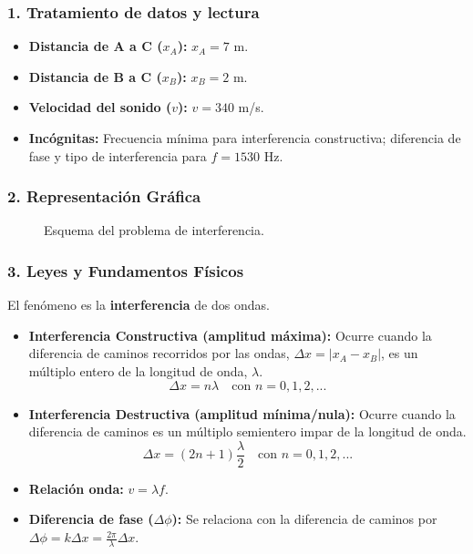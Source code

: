 \subsubsection*{1. Tratamiento de datos y lectura}
\begin{itemize}
    \item \textbf{Distancia de A a C ($x_A$):} $x_A = 7$ m.
    \item \textbf{Distancia de B a C ($x_B$):} $x_B = 2$ m.
    \item \textbf{Velocidad del sonido ($v$):} $v = 340$ m/s.
    \item \textbf{Incógnitas:} Frecuencia mínima para interferencia constructiva; diferencia de fase y tipo de interferencia para $f=1530$ Hz.
\end{itemize}

\subsubsection*{2. Representación Gráfica}
\begin{figure}[H]
    \centering
    \caption{Esquema del problema de interferencia.}
\end{figure}

\subsubsection*{3. Leyes y Fundamentos Físicos}
El fenómeno es la \textbf{interferencia} de dos ondas.
\begin{itemize}
    \item \textbf{Interferencia Constructiva (amplitud máxima):} Ocurre cuando la diferencia de caminos recorridos por las ondas, $\Delta x = |x_A - x_B|$, es un múltiplo entero de la longitud de onda, $\lambda$.
    $$\Delta x = n\lambda \quad \text{con } n=0, 1, 2, ...$$
    \item \textbf{Interferencia Destructiva (amplitud mínima/nula):} Ocurre cuando la diferencia de caminos es un múltiplo semientero impar de la longitud de onda.
    $$\Delta x = (2n+1)\frac{\lambda}{2} \quad \text{con } n=0, 1, 2, ...$$
    \item \textbf{Relación onda:} $v = \lambda f$.
    \item \textbf{Diferencia de fase ($\Delta\phi$):} Se relaciona con la diferencia de caminos por $\Delta\phi = k \Delta x = \frac{2\pi}{\lambda}\Delta x$.
\end{itemize}

